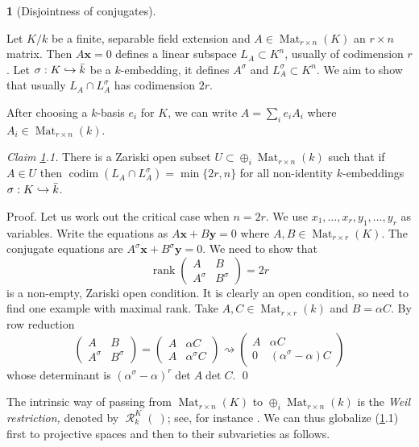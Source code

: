 \documentclass{amsart}
\theoremstyle{definition}
\newtheorem{say}[thm]{}
\theoremstyle{remark}
\newcommand{\rank}[0]{\operatorname{rank}}
\newcommand{\codim}[0]{\operatorname{codim}}
\newcommand{\res}[0]{\operatorname{\mathcal R}}
\def\into{\DOTSB\lhook\joinrel\to}
\begin{document}
\begin{say}[Disjointness of conjugates]\label{disj.conj.say}

Let $K/k$ be a finite, separable  field extension and 
$A\in \operatorname{Mat}_{r\times n}(K)$ an $r\times n$ matrix.
Then  $A{\mathbf x}=0$ defines a  linear subspace
$L_A\subset K^n$, usually of codimension $r$.
Let  $\sigma:K\into \bar k$ be a $k$-embedding, it defines
$A^\sigma$ and  $L_A^\sigma\subset K^n$.  We aim to show that usually
$L_A\cap L_A^\sigma$ has codimension $2r$.

  After choosing a $k$-basis $e_i$ for $K$, we can write
$A=\sum_i e_i A_i$ where  $A_i\in \operatorname{Mat}_{r\times n}(k)$.

\medskip
{\it Claim \ref{disj.conj.say}.1.} There is a Zariski open subset $U\subset \oplus_i \operatorname{Mat}_{r\times n}(k)$
such that if $A\in U$ then $\codim (L_A\cap L_A^\sigma)=\min\{2r,n\}$ for all non-identity $k$-embeddings $\sigma:K\into \bar k$.
\medskip

Proof. Let us work out the critical case when $n=2r$. 
We use  $x_1,\dots, x_r, y_1,\dots, y_r$ as variables.
Write  the equations as  $A{\mathbf x}+B{\mathbf y}=0$ where
$A, B\in \operatorname{Mat}_{r\times r}(K)$. 
The conjugate equations  are  $A^\sigma{\mathbf x}+B^\sigma{\mathbf y}=0$. We need to show that  
$$
\rank\left(
\begin{array}{cc}
A & B \\
A^\sigma & B^\sigma
\end{array}
\right)=2r
$$
is a non-empty, Zariski  open condition. It  is clearly an open condition, so need to find one example with maximal rank.
Take  $A, C\in \operatorname{Mat}_{r\times r}(k)$ and $B=\alpha C$. By row reduction
$$
\left(
\begin{array}{cc}
A & B \\
A^\sigma & B^\sigma
\end{array}
\right)
=
\left(
\begin{array}{cc}
A &  \alpha C\\
A & \alpha^\sigma C
\end{array}
\right)
\rightsquigarrow
\left(
\begin{array}{cc}
A &  \alpha C\\
0 & (\alpha^\sigma-\alpha)C
\end{array}
\right)
$$
 whose determinant is  $(\alpha^\sigma-\alpha)^r\det A\det C$. \qed

\medskip

The intrinsic way of passing from  $\operatorname{Mat}_{r\times n}(K)$ to $\oplus_i \operatorname{Mat}_{r\times n}(k)$ is the {\it Weil restriction,} denoted by $\res^K_k(\ )$; see, for instance  \cite[Sec.7.6]{blr}. 
We can thus globalize
(\ref{disj.conj.say}.1) first to projective spaces and then to 
their subvarieties as follows.


\end{say}
\end{document}

